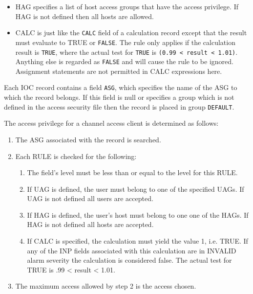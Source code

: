 \begin{itemize}
\begin{itemize}
\item {}HAG specifies a list of host access groups that have the access privilege. If HAG is not defined then 
all hosts are allowed.

\item {}CALC is just like the \verb|CALC| field of a calculation record except that the result must evaluate to TRUE 
or \verb|FALSE|. The rule only applies if the calculation result is \verb|TRUE|, where the actual test for \verb|TRUE| is 
\verb|(0.99 < result < 1.01)|. Anything else is regarded as \verb|FALSE| and will cause the rule to be 
ignored. Assignment statements are not permitted in CALC expressions here.

\end{itemize}
\end{itemize}

Each IOC record contains a field \verb|ASG|, which specifies the name of the ASG to which the record belongs. If this field is 
null or specifies a group which is not defined in the access security file then the record is placed in group \verb|DEFAULT|.

The access privilege for a channel access client is determined as follows:

\begin{enumerate}
\item The ASG associated with the record is searched.

\item Each RULE is checked for the following:

\begin{enumerate}

\item The field's level must be less than or equal to the level for this RULE.

\item If UAG is defined, the user must belong to one of the specified UAGs. If UAG is not defined all users are 
accepted.

\item If HAG is defined, the user's host must belong to one one of the HAGs. If HAG is not defined all hosts are 
accepted.

\item If CALC is specified, the calculation must yield the value 1, i.e. TRUE. If any of the INP fields associated 
with this calculation are in INVALID alarm severity the calculation is considered false. The actual test for 
TRUE is .99 \textless{} result \textless{} 1.01.

\end{enumerate}

\item The maximum access allowed by step 2 is the access chosen.

\end{enumerate}


